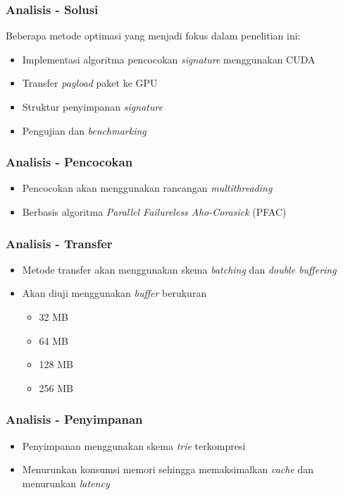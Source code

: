 \documentclass{beamer}
\begin{document}

\begin{frame}
\frametitle{Analisis - Solusi}
Beberapa metode optimasi yang menjadi fokus dalam penelitian ini:
\begin{itemize}
  \item Implementasi algoritma pencocokan \emph{signature} menggunakan CUDA
  \item Transfer \emph{payload} paket ke GPU
  \item Struktur penyimpanan \emph{signature}
  \item Pengujian dan \emph{benchmarking}
\end{itemize}
\end{frame}


\begin{frame}
\frametitle{Analisis - Pencocokan}
\begin{itemize}
  \item Pencocokan akan menggunakan rancangan \emph{multithreading}
  \item Berbasis algoritma \emph{Parallel Failureless Aho-Corasick} (PFAC)
\end{itemize}
\end{frame}


\begin{frame}
\frametitle{Analisis - Transfer}
\begin{itemize}
  \item Metode transfer akan menggunakan skema \emph{batching} dan \emph{double buffering}
  \item Akan diuji menggunakan \emph{buffer} berukuran
  \begin{itemize}
    \item 32 MB
    \item 64 MB
    \item 128 MB
    \item 256 MB
  \end{itemize}
\end{itemize}
\end{frame}


\begin{frame}
\frametitle{Analisis - Penyimpanan}
\begin{itemize}
  \item Penyimpanan menggunakan skema \emph{trie} terkompresi
  \item Menurunkan konsumsi memori sehingga memaksimalkan \emph{cache} dan menurunkan \emph{latency}
\end{itemize}
\end{frame}
\end{document}
